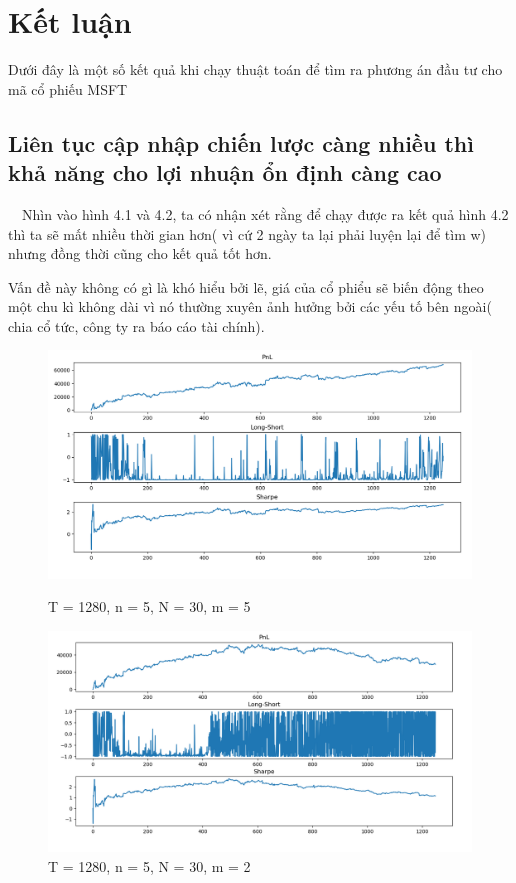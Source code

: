 \documentclass[14pt]{extreport}
\begin{document}
\chapter{Kết luận}

Dưới đây là một số kết quả khi chạy thuật toán để tìm ra phương án đầu tư cho mã cổ phiếu MSFT

\section{Liên tục cập nhập chiến lược càng nhiều thì khả năng cho lợi nhuận ổn định càng cao}

$\quad$Nhìn vào hình 4.1 và 4.2, ta có nhận xét rằng để chạy được ra kết quả hình 4.2 thì ta sẽ mất nhiều thời gian hơn( vì cứ 2 ngày ta lại phải luyện lại để tìm w) nhưng đồng thời cũng cho kết quả tốt hơn.

Vấn đề này không có gì là khó hiểu bởi lẽ, giá của cổ phiểu sẽ biến động theo một chu kì không dài vì nó thường xuyên ảnh hưởng bởi các yếu tố bên ngoài( chia cổ tức, công ty ra báo cáo tài chính).
\begin{center}
    \begin{figure}[htp]
    \begin{center}
     \includegraphics[scale=.4]{result_1-1}
    \end{center}
    \caption{T = 1280, n = 5, N = 30, m = 5}
    \begin{center}
     \includegraphics[scale=.4]{result_1-2}
    \end{center}
    \caption{T = 1280, n = 5, N = 30, m = 2}
    \end{figure}
\end{center} 
\end{document}
